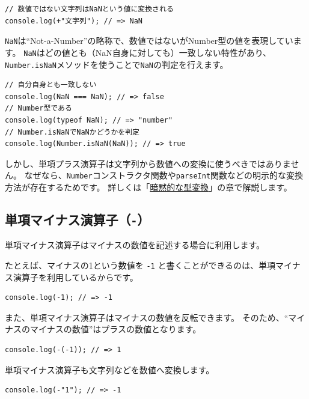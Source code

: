 \begin{lstlisting}
// 数値ではない文字列はNaNという値に変換される
console.log(+"文字列"); // => NaN
\end{lstlisting}

\texttt{NaN}は``Not-a-Number''の略称で、数値ではないがNumber型の値を表現しています。
\texttt{NaN}はどの値とも（NaN自身に対しても）一致しない特性があり、\texttt{Number.isNaN}メソッドを使うことで\texttt{NaN}の判定を行えます。

\begin{lstlisting}
// 自分自身とも一致しない
console.log(NaN === NaN); // => false
// Number型である
console.log(typeof NaN); // => "number"
// Number.isNaNでNaNかどうかを判定
console.log(Number.isNaN(NaN)); // => true
\end{lstlisting}

しかし、単項プラス演算子は文字列から数値への変換に使うべきではありません。
なぜなら、\texttt{Number}コンストラクタ関数や\texttt{parseInt}関数などの明示的な変換方法が存在するためです。
詳しくは「\hyperlink{implicit-coercion}{暗黙的な型変換}」の章で解説します。

\hypertarget{unary-minus-operator}{%
\subsection{\texorpdfstring{単項マイナス演算子（\texttt{-}）}{単項マイナス演算子（-）}}\label{unary-minus-operator}}

単項マイナス演算子はマイナスの数値を記述する場合に利用します。

たとえば、マイナスの1という数値を \texttt{-1}
と書くことができるのは、単項マイナス演算子を利用しているからです。

\begin{lstlisting}
console.log(-1); // => -1
\end{lstlisting}

また、単項マイナス演算子はマイナスの数値を反転できます。
そのため、``マイナスのマイナスの数値''はプラスの数値となります。

\begin{lstlisting}
console.log(-(-1)); // => 1
\end{lstlisting}

単項マイナス演算子も文字列などを数値へ変換します。

\begin{lstlisting}
console.log(-"1"); // => -1
\end{lstlisting}

